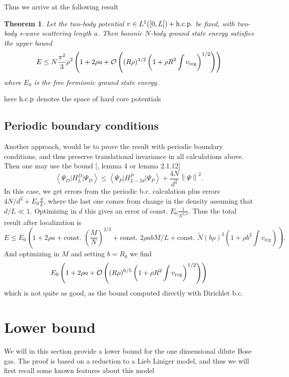 \documentclass[a4paper,11pt]{article}
\newcommand{\norm}[1]{\left\lVert #1 \right\rVert}
\renewcommand{\braket}[1]{\left\langle#1\right\rangle}
\newtheorem{theorem}{Theorem}
\numberwithin{equation}{section}
\begin{document}
	Thus we arrive at the following result
	\begin{theorem}
		Let the two-body potential $ v\in L^{1}([0,L])+\textnormal{h.c.p.} $ be fixed, with two-body s-wave scattering length $ a $. Then bosonic $ N $-body ground state energy satisfies the upper bound\begin{equation}
		E\leq N\frac{\pi^2}{3}\rho^2\left(1+2\rho a + \mathcal{O}\left((R\rho)^{3/2}\left(1+\rho R^2 \int v_{\textnormal{reg}}\right)^{1/2}\right)\right)
		\end{equation}
		where $ E_0 $ is the free fermionic ground state energy.
	\end{theorem}
	here $ \textnormal{h.c.p} $ denotes the space of hard core potentials
	
	\subsection{Periodic boundary conditions}
	Another approach, would be to prove the result with periodic boundary conditions, and thus preserve translational invariance in all calculations above. Then one may use the bound [\cite{2020JMP....61f1901M}, lemma 4 or \cite{robinson2014thermodynamic} lemma 2.1.12] \begin{equation}
	\braket{\Psi_D\lvert H^D_L \rvert \Psi_D}\leq \braket{\Psi_P\lvert H^P_{L-2d}\rvert \Psi_P}+\frac{4N}{d^2}\norm{\Psi}^2.
	\end{equation}
	In this case, we get errors from the periodic b.c. calculation plus errors $ 4N/d^2+E_0\frac{d}{L} $, where the last one comes from change in the density assuming that $ d/L\ll 1 $. Optimizing in $ d $ this gives an error of $ \text{const. }E_0 \frac{1}{N^{2/3}} $. Thus the total result after localization is \begin{equation}
	E\leq E_0\left(1+2\rho a+\text{const. }\left(\frac{M}{N}\right)^{2/3}+\text{const. }2\rho abM/L+\text{const. }\tilde{N}(b\rho)^3\left(1+\rho b^2\int v_{\text{reg}}\right)\right).
	\end{equation}
	And optimizing in $ M $ and setting $ b=R_0 $ we find\begin{equation}
	E_0\left(1+2\rho a + \mathcal{O}\left((R\rho)^{6/5}\left(1+\rho R^2 \int v_{\textnormal{reg}}\right)^{1/2}\right)\right)
	\end{equation}
	which is not quite as good, as the bound computed directly with Dirichlet b.c.

	\section{Lower bound}
	We will in this section provide a lower bound for the one dimensional dilute Bose gas. The proof is based on a reduction to a Lieb Liniger model, and thus we will first recall some known features about this model
\end{document}
